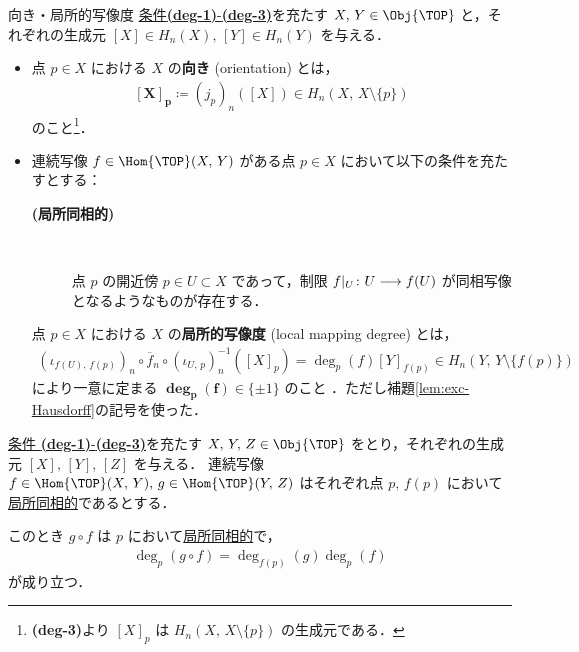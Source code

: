 \documentclass[algtopo_main]{subfiles}
\begin{document}
\begin{mydef}[label=def:loc-degree, breakable]{向き・局所的写像度}
    \hyperref[def:degree]{条件\textbf{\textsf{(deg-1)}}-\textbf{\textsf{(deg-3)}}}を充たす $X,\, Y \in \Obj{\TOP}$ と，それぞれの生成元 $[X] \in H_n(X),\, [Y] \in H_n(Y)$ を与える．
    \begin{itemize}
        \item 点 $p \in X$ における $X$ の\textbf{向き} (orientation) とは，
        \begin{align}
            \bm{[X]_p} \coloneqq (j_p)_n([X]) \in H_n(X,\, X\setminus\{p\})
        \end{align}
        のこと\footnote{\textbf{\textsf{(deg-3)}}より $[X]_p$ は $H_n(X,\, X\setminus\{p\})$ の生成元である．}．
        \item 連続写像 $f \in \Hom{\TOP}(X,\, Y)$ がある点 $p \in X$ において以下の条件を充たすとする：
        \begin{description}
            \item[\textbf{(局所同相的)}] 　
            
            点 $p$ の開近傍 $p \in U \subset X$ であって，制限 $f|_U \colon U \longrightarrow f(U)$ が同相写像となるようなものが存在する．
        \end{description}
        点 $p \in X$ における $X$ の\textbf{局所的写像度} (local mapping degree) とは，
        \begin{align}
            (\iota_{f(U),\, f(p)})_n \circ \overline{f}_n \circ (\iota_{U,\, p})^{-1}_n([X]_p) = \deg_p(f)[Y]_{f(p)} \in H_n(Y,\, Y\setminus\{f(p)\})
        \end{align}
        により一意に定まる $\bm{\deg_p(f)} \in \{\pm 1\}$ のこと
        ．ただし補題\ref{lem:exc-Hausdorff}の記号を使った．
    \end{itemize}
\end{mydef}

\begin{myprop}[label=lem:loc-degree-basic]{}
    \hyperref[def:degree]{条件 \textbf{\textsf{(deg-1)}}-\textbf{\textsf{(deg-3)}}}を充たす $X,\, Y,\, Z \in \Obj{\TOP}$ をとり，それぞれの生成元 $[X],\, [Y],\, [Z]$ を与える．
    連続写像 $f \in \Hom{\TOP}(X,\, Y),\,  g \in \Hom{\TOP}(Y,\, Z)$ はそれぞれ点 $p,\, f(p)$ において\hyperref[def:loc-degree]{局所同相的}であるとする．
    
    このとき $g \circ f$ は $p$ において\hyperref[def:loc-degree]{局所同相的}で，
    \begin{align}
        \deg_p(g \circ f) = \deg_{f(p)}(g) \deg_p (f)
    \end{align}
    が成り立つ．
\end{myprop}
\end{document}
